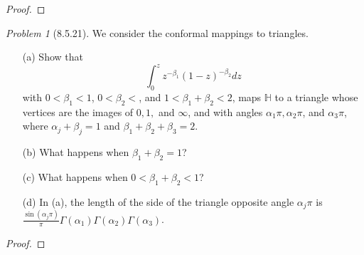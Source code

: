 \documentclass[10pt]{article}
\newcommand{\sk}{\vskip 6mm}
\newcommand{\bb}[1]{\mathbb{#1}}
\theoremstyle{remark}
\newtheorem{problem}{Problem}
\theoremstyle{remark}
\begin{document}
\begin{proof}
  
\end{proof}

\sk

\begin{problem}[8.5.21]
  We consider the conformal mappings to triangles.
  \begin{enumerate}
  \item[(a)] Show that
    \[
      \int_0^z z^{-\beta_1}(1-z)^{-\beta_2}dz
    \]
    with $0<\beta_1<1$, $0<\beta_2<$, and $1<\beta_1+\beta_2<2$, maps $\bb{H}$ to a triangle whose vertices are the images of $0,1,$ and $\infty$, and with angles $\alpha_1\pi,\alpha_2\pi$, and $\alpha_3\pi$, where $\alpha_j+\beta_j=1$ and $\beta_1+\beta_2+\beta_3=2$.
  \item[(b)] What happens when $\beta_1+\beta_2=1$?
  \item[(c)] What happens when $0<\beta_1+\beta_2<1$?
  \item[(d)] In (a), the length of the side of the triangle opposite angle $\alpha_j\pi$ is $\frac{\sin(\alpha_j\pi)}{\pi}\Gamma(\alpha_1)\Gamma(\alpha_2)\Gamma(\alpha_3)$.
  \end{enumerate}
\end{problem}

\begin{proof}
  
\end{proof}

\sk
\end{document}
